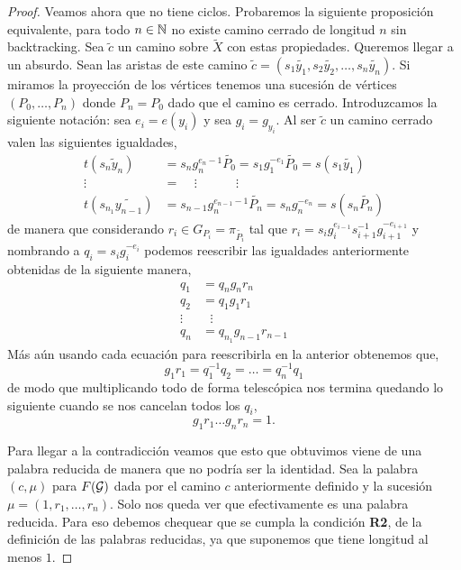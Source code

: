 \documentclass[tesis.tex]{subfiles}
\begin{document}
\begin{proof}
	Veamos ahora que no tiene ciclos.
	Probaremos la siguiente proposición equivalente, para todo $n \in \mathbb{N}$ no existe camino cerrado de longitud $n$ sin backtracking.
	Sea $\tilde c$ un camino sobre $\tilde X$ con estas propiedades. 
	Queremos llegar a un absurdo.
	Sean las aristas de este camino $\tilde c = (s_1\tilde{y_1}, s_2 \tilde{y_2}, \dots, s_n \tilde{ y_n})$.
	Si miramos la proyección de los vértices tenemos una sucesión de vértices $(P_0, \dots, P_n)$ donde $P_n = P_0$ dado que el camino es cerrado.
	Introduzcamos la siguiente notación: sea $e_i = e(y_i)$ y sea $g_i = g_{y_i}$.
	Al ser $\tilde c$ un camino cerrado valen las siguientes igualdades,
	\begin{align*}
		t(s_n\tilde y_n) &= s_ng_n^{e_n - 1}\tilde{P_0} = s_1g_1^{-e_1} \tilde{P_0} = s(s_1\tilde{ y_1}) \\ 
		\vdots \ \ \  &= \ \ \ \ \    \vdots\ \ \ \ \ \ \ \ \ \ \ \ \ \    \vdots \\
		t(s_{n_1}\widetilde{ y_{n-1}}) &= s_{n-1}g_n^{e_{n-1} - 1}\tilde{P_n} = s_ng_n^{-e_n} = s(s_n\tilde{P_n} )  
	\end{align*}
	de manera que considerando $r_i \in G_{P_i} = \pi_{\tilde{ P_i}}$ tal que $r_i = s_ig_i^{e_{i-1}} s_{i+1}^{-1} g_{i+1}^{-e_{i+1}}$ y nombrando a $q_i = s_ig_i^{-e_i}$ 
	podemos reescribir las igualdades anteriormente obtenidas de la siguiente manera,
	\begin{align*}
		q_1 &= q_ng_nr_n \\
		q_2 &= q_1g_1r_1 \\
		\vdots & \ \ \ \vdots \\
		q_n &= q_{n_1}g_{n-1}r_{n-1} 
	\end{align*}
	Más aún usando cada ecuación para reescribirla en la anterior obtenemos que,
	\begin{equation*}
		g_1r_1 = q_1^{-1} q_2 = \dots = q_n^{-1}q_1
	\end{equation*}
	de modo que multiplicando todo de forma telescópica nos termina quedando lo siguiente cuando se nos cancelan todos los $q_i$,
	\begin{equation*}
		g_1r_1\dots g_nr_n = 1.
	\end{equation*} 
	
	Para llegar a la contradicción veamos que esto que obtuvimos viene de una palabra reducida de manera que no podría ser la identidad.
	Sea la palabra $(c, \mu)$ para $F({\cal G})$ dada por el camino $c$ anteriormente definido y la sucesión $\mu = (1,r_1, \dots, r_n)$.
	Solo nos queda ver que efectivamente es una palabra reducida. 
	Para eso debemos chequear que se cumpla la condición \textbf{R2}, de la definición de las palabras reducidas, ya que suponemos que tiene longitud al menos $1$.
	

\end{proof}
\end{document}
